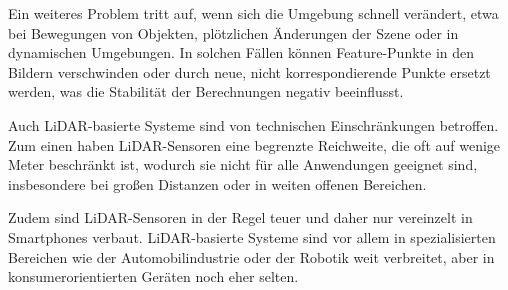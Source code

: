 Ein weiteres Problem tritt auf, wenn sich die Umgebung schnell verändert, etwa bei Bewegungen von Objekten, plötzlichen Änderungen der Szene oder in dynamischen Umgebungen. In solchen Fällen können Feature-Punkte in den Bildern verschwinden oder durch neue, nicht korrespondierende Punkte ersetzt werden, was die Stabilität der Berechnungen negativ beeinflusst.

Auch LiDAR-basierte Systeme sind von technischen Einschränkungen betroffen. Zum einen haben LiDAR-Sensoren eine begrenzte Reichweite, die oft auf wenige Meter beschränkt ist, wodurch sie nicht für alle Anwendungen geeignet sind, insbesondere bei großen Distanzen oder in weiten offenen Bereichen.

Zudem sind LiDAR-Sensoren in der Regel teuer und daher nur vereinzelt in Smartphones verbaut. LiDAR-basierte Systeme sind vor allem in spezialisierten Bereichen wie der Automobilindustrie oder der Robotik weit verbreitet, aber in konsumerorientierten Geräten noch eher selten.